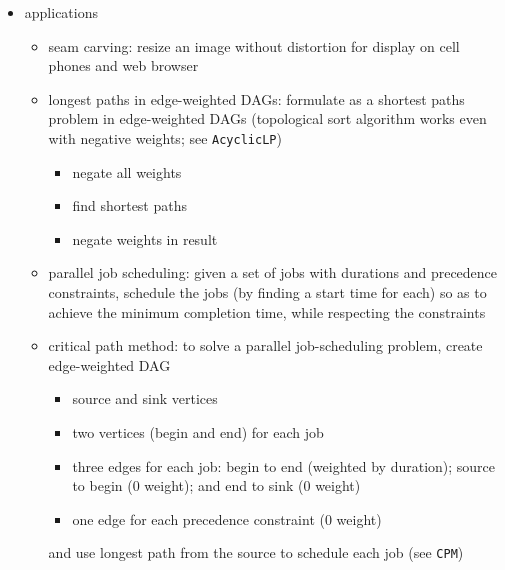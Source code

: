 \documentclass[8pt,a4paper,compress]{beamer}
\begin{document}
\begin{frame}[fragile]
\begin{itemize}
\item applications
\begin{itemize}
\item seam carving: resize an image without distortion for display on cell phones and web browser

\item longest paths in edge-weighted DAGs: formulate as a shortest paths problem in edge-weighted DAGs (topological sort algorithm works even with negative weights; see \lstinline{AcyclicLP})
\begin{itemize}
\item negate all weights

\item find shortest paths

\item negate weights in result
\end{itemize}

\item parallel job scheduling: given a set of jobs with durations and precedence
constraints, schedule the jobs (by finding a start time for each) so as to
achieve the minimum completion time, while respecting the constraints

\item critical path method: to solve a parallel job-scheduling problem, create edge-weighted DAG
\begin{itemize}
\item source and sink vertices
\item two vertices (begin and end) for each job
\item three edges for each job: begin to end (weighted by duration); source to begin (0 weight); and end to sink (0 weight)
\item one edge for each precedence constraint (0 weight)
\end{itemize}
and use longest path from the source to schedule each job (see \lstinline{CPM})
\end{itemize}
\end{itemize}
\end{frame}
\end{document}
